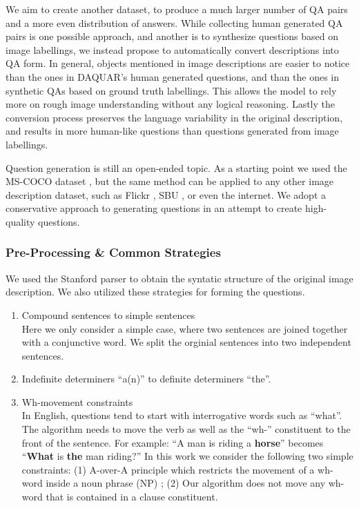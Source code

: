 \documentclass{article} %
\renewcommand{\#}[1]{\textbf{#1}}
\begin{document}
We aim to create another dataset, to produce a much larger number of QA pairs
and a more even distribution of answers. While collecting human generated QA
pairs is one possible approach, and another is to synthesize questions based on
image labellings, we instead propose to automatically convert descriptions into
QA form. In general, objects mentioned in image descriptions are easier to
notice than the ones in DAQUAR's human generated questions, and than the ones
in synthetic QAs based on ground truth labellings. This allows the model to
rely more on rough image understanding without any logical reasoning. Lastly
the conversion process preserves the language variability in the original
description, and results in more human-like questions than questions generated
from image labellings.

Question generation is still an open-ended topic. As a starting point we used
the MS-COCO dataset \cite{mscoco}, but the same method can be applied to any
other image description dataset, such as Flickr \cite{flickr8k}, SBU
\cite{ordonez11}, or even the internet. We adopt a conservative approach to
generating questions in an attempt to create high-quality questions.

\subsubsection{Pre-Processing \& Common Strategies}

We used the Stanford parser \cite{klein03} to obtain the syntatic structure of
the original image description. We also utilized these strategies for forming
the questions.

\begin{enumerate}[leftmargin=*]

\item Compound sentences to simple sentences \\ Here we only consider a simple
case, where two sentences are joined together with a conjunctive word. We split
the orginial sentences into two independent sentences.

\item Indefinite determiners ``a(n)'' to definite determiners ``the''.

\item Wh-movement constraints \\ In English, questions tend to start with
interrogative words such as ``what''. The algorithm needs to move the verb as
well as the ``wh-'' constituent to the front of the sentence. For example: ``A
man is riding a \textbf{horse}'' becomes   ``\textbf{What} is \textbf{the} man
riding?'' In this work we consider the following two simple constraints: (1)
A-over-A principle which restricts the movement of a wh-word inside a noun
phrase (NP) \cite{chomsky73}; (2) Our algorithm does not move any wh-word that
is contained in a clause constituent.

\end{enumerate}
\end{document}
